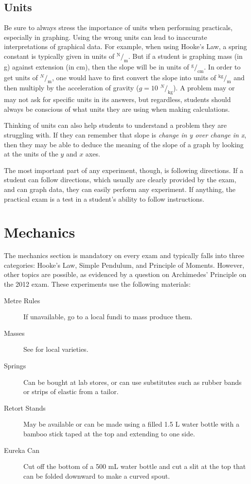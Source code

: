 \subsection{Units}
Be sure to always stress the importance of units when performing practicals, especially in graphing. Using the wrong units can lead to inaccurate interpretations of graphical data. For example, when using Hooke's Law, a spring constant is typically given in units of $^{\text{N}}/_{\text{m}}$. But if a student is graphing mass (in g) against extension (in cm), then the slope will be in units of $^{\text{g}}/_{\text{cm}}$. In order to get units of $^N/_{\text{m}}$, one would have to first convert the slope into units of $^{\text{kg}}/_{\text{m}}$ and then multiply by the acceleration of gravity ($g = 10$ $^N/_{\text{kg}}$). A problem may or may not ask for specific units in its answers, but regardless, students should always be conscious of what units they are using when making calculations.

Thinking of units can also help students to understand a problem they are struggling with. If they can remember that slope is \emph{change in y over change in x}, then they may be able to deduce the meaning of the slope of a graph by looking at the units of the $y$ and $x$ axes.

The most important part of any experiment, though, is following directions. If a
student can follow directions, which usually are clearly provided by the exam, and can
graph data, they can easily perform any experiment. If anything, the practical exam is a
test in a student’s ability to follow instructions.

\section{Mechanics}

The mechanics section is mandatory on every exam and typically falls into three
categories: Hooke’s Law, Simple Pendulum, and Principle of Moments. However, other topics are possible, as evidenced by a question on Archimedes' Principle on the 2012 exam. These experiments use the following materials:
\begin{description}
\item[Metre Rules]{If unavailable, go to a local fundi to mass produce them.}
\item[Masses]{See  for local varieties.}
\item[Springs]{Can be bought at lab stores, or can use substitutes such as rubber bands or strips of elastic from a tailor.}
\item[Retort Stands]{May be available or can be made using a filled 1.5 L water bottle with a bamboo stick taped at the top and extending to one side.}
\item[Eureka Can]{Cut off the bottom of a 500 mL water bottle and cut a slit at the top that can be folded downward to make a curved spout.}
\end{description}

